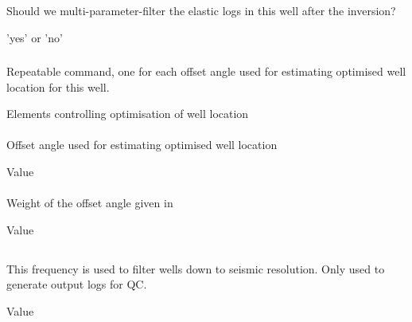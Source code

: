 \subsubsection{}
 \slist
   \item \Description Should we multi-parameter-filter the elastic
                      logs in this well after the inversion?
   \item \Argument 'yes' or 'no'
   \item \Default
 \elist

\subsubsection{}
 \slist
   \item \Description Repeatable command, one for each offset angle used for estimating optimised well location for this well.
   \item \Argument Elements controlling optimisation of well location
   \item \Default
 \elist

\paragraph{}
 \slist
    \item \Description Offset angle used for estimating optimised well location
    \item \Argument Value
    \item \Default
 \elist

\paragraph{}
 \slist
    \item \Description Weight of the offset angle given in 
    \item \Argument Value
    \item {}
 \elist

\subsection{}
 \slist
   \item \Description This frequency is used to filter wells down to seismic resolution. Only used to generate output logs for QC.
   \item \Argument Value
   \item \Default
 \elist

